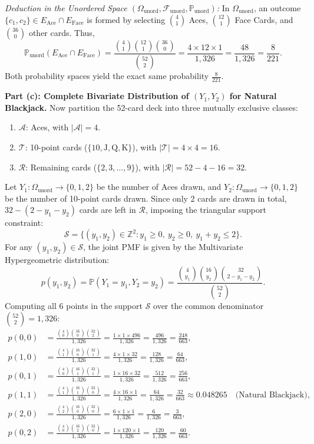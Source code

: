 \documentclass[11pt, letterpaper]{article}
\theoremstyle{definition}
\theoremstyle{remark}
\newcommand{\Z}{\mathbb{Z}}
\newcommand{\Prob}{\mathbb{P}}
\newcommand{\F}{\mathcal{F}}
\begin{document}
\emph{Deduction in the Unordered Space $(\Omega_{\text{unord}}, \F_{\text{unord}}, \Prob_{\text{unord}})$:}
In $\Omega_{\text{unord}}$, an outcome $\{c_1, c_2\} \in E_{\text{Ace}} \cap E_{\text{Face}}$ is formed by selecting $\binom{4}{1}$ Aces, $\binom{12}{1}$ Face Cards, and $\binom{36}{0}$ other cards. Thus,
\[
\Prob_{\text{unord}}(E_{\text{Ace}} \cap E_{\text{Face}}) = \frac{\binom{4}{1}\binom{12}{1}\binom{36}{0}}{\binom{52}{2}} = \frac{4 \times 12 \times 1}{1{,}326} = \frac{48}{1{,}326} = \frac{8}{221}.
\]
Both probability spaces yield the exact same probability $\frac{8}{221}$.

\textbf{Part (c): Complete Bivariate Distribution of $(Y_1, Y_2)$ for Natural Blackjack.}
Now partition the 52-card deck into three mutually exclusive classes:
\begin{enumerate}[label=\arabic*.]
    \item $\mathcal{A}$: Aces, with $|\mathcal{A}| = 4$.
    \item $\mathcal{T}$: 10-point cards ($\{10, \text{J}, \text{Q}, \text{K}\}$), with $|\mathcal{T}| = 4 \times 4 = 16$.
    \item $\mathcal{R}$: Remaining cards ($\{2, 3, \dots, 9\}$), with $|\mathcal{R}| = 52 - 4 - 16 = 32$.
\end{enumerate}
Let $Y_1 : \Omega_{\text{unord}} \to \{0, 1, 2\}$ be the number of Aces drawn, and $Y_2 : \Omega_{\text{unord}} \to \{0, 1, 2\}$ be the number of 10-point cards drawn. Since only 2 cards are drawn in total, $32 - (2 - y_1 - y_2)$ cards are left in $\mathcal{R}$, imposing the triangular support constraint:
\[
\mathcal{S} = \bigl\{(y_1, y_2) \in \Z^2 : y_1 \ge 0,\ y_2 \ge 0,\ y_1 + y_2 \le 2\bigr\}.
\]
For any $(y_1, y_2) \in \mathcal{S}$, the joint PMF is given by the Multivariate Hypergeometric distribution:
\[
p(y_1, y_2) = \Prob(Y_1 = y_1, Y_2 = y_2) = \frac{\binom{4}{y_1}\binom{16}{y_2}\binom{32}{2 - y_1 - y_2}}{\binom{52}{2}}.
\]
Computing all 6 points in the support $\mathcal{S}$ over the common denominator $\binom{52}{2} = 1{,}326$:
\begin{align*}
p(0, 0) &= \frac{\binom{4}{0}\binom{16}{0}\binom{32}{2}}{1{,}326} = \frac{1 \times 1 \times 496}{1{,}326} = \frac{496}{1{,}326} = \frac{248}{663}, \\
p(1, 0) &= \frac{\binom{4}{1}\binom{16}{0}\binom{32}{1}}{1{,}326} = \frac{4 \times 1 \times 32}{1{,}326} = \frac{128}{1{,}326} = \frac{64}{663}, \\
p(0, 1) &= \frac{\binom{4}{0}\binom{16}{1}\binom{32}{1}}{1{,}326} = \frac{1 \times 16 \times 32}{1{,}326} = \frac{512}{1{,}326} = \frac{256}{663}, \\
p(1, 1) &= \frac{\binom{4}{1}\binom{16}{1}\binom{32}{0}}{1{,}326} = \frac{4 \times 16 \times 1}{1{,}326} = \frac{64}{1{,}326} = \frac{32}{663} \approx 0.048265 \quad \text{(Natural Blackjack)}, \\
p(2, 0) &= \frac{\binom{4}{2}\binom{16}{0}\binom{32}{0}}{1{,}326} = \frac{6 \times 1 \times 1}{1{,}326} = \frac{6}{1{,}326} = \frac{3}{663}, \\
p(0, 2) &= \frac{\binom{4}{0}\binom{16}{2}\binom{32}{0}}{1{,}326} = \frac{1 \times 120 \times 1}{1{,}326} = \frac{120}{1{,}326} = \frac{60}{663}.
\end{align*}
\end{document}
